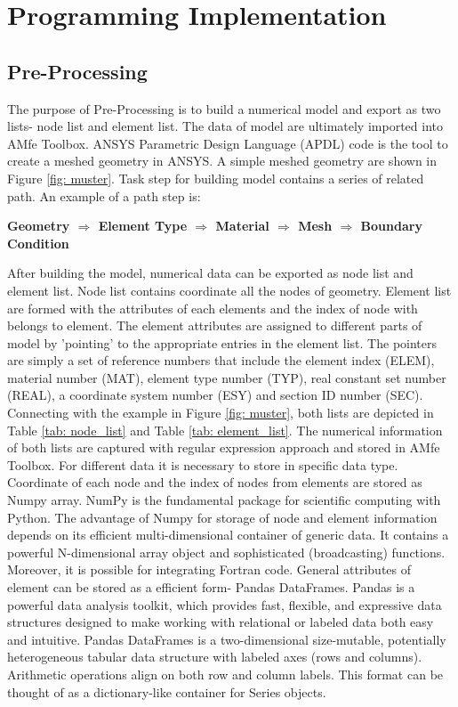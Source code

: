 \chapter{Programming Implementation}
\section{Pre-Processing}
The purpose of Pre-Processing is to build a numerical model and export as two lists- node list and element list.  The data of model are ultimately imported into AMfe Toolbox. ANSYS Parametric Design Language (APDL) code is the tool to create a meshed geometry in ANSYS. A simple meshed geometry are shown in Figure \ref{fig: muster}. Task step for building model contains a series of related path. An example of a path step is: 

\begin{center}
	\large{\textbf{Geometry $\Rightarrow$ Element Type $\Rightarrow$ Material $\Rightarrow$ Mesh
			$\Rightarrow$ Boundary Condition  }}
\end{center}

After building the model, numerical data can be exported as node list and element list. Node list contains coordinate all the nodes of geometry. Element list are formed with the attributes of each elements and the index of node with belongs to element. The element attributes are assigned to different parts of model by 'pointing' to the appropriate entries in the element list. The pointers are simply a set of reference numbers that include  the element index (ELEM), material number (MAT), element type number (TYP), real constant set number (REAL), a coordinate system number (ESY) and section ID number (SEC). Connecting with the example in Figure \ref{fig: muster}, both lists are depicted in Table \ref{tab: node_list} and Table \ref{tab: element_list}. The numerical information of both lists are captured with regular expression approach and stored in AMfe Toolbox. For different data it is necessary to store in specific data type. Coordinate of each node and the index of nodes from elements are stored as Numpy array. NumPy is the fundamental package for scientific computing with Python. The advantage of Numpy for storage of node and element information depends on its efficient multi-dimensional container of generic data. It contains a powerful N-dimensional array object and sophisticated (broadcasting) functions. Moreover, it is possible for integrating Fortran code. General attributes of element can be stored as a efficient form- Pandas DataFrames. Pandas is a powerful data analysis toolkit, which provides fast, flexible, and expressive data structures designed to make working with relational or labeled data both easy and intuitive. Pandas DataFrames is a two-dimensional size-mutable, potentially heterogeneous tabular data structure with labeled axes (rows and columns). Arithmetic operations align on both row and column labels. This format can be thought of as a dictionary-like container for Series objects. 

